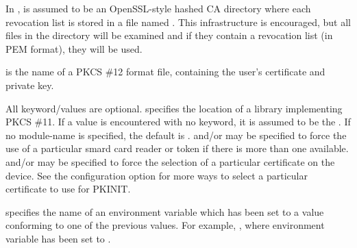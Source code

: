\documentclass[letterpaper,10pt,english]{sphinxmanual}
\begin{document}
\begin{description}
In ,  is assumed to be an OpenSSL-style
hashed CA directory where each revocation list is stored in a file
named .  This infrastructure is encouraged,
but all files in the directory will be examined and if they
contain a revocation list (in PEM format), they will be used.

\item[{\sphinxstylestrong{PKCS12:}\sphinxstyleemphasis{filename}}] \leavevmode
{} is the name of a PKCS \#12 format file, containing the
user’s certificate and private key.

\item[{\sphinxstylestrong{PKCS11:}{[}\sphinxstylestrong{module\_name=}{]}\sphinxstyleemphasis{modname}{[}\sphinxstylestrong{:slotid=}\sphinxstyleemphasis{slot-id}{]}{[}\sphinxstylestrong{:token=}\sphinxstyleemphasis{token-label}{]}{[}\sphinxstylestrong{:certid=}\sphinxstyleemphasis{cert-id}{]}{[}\sphinxstylestrong{:certlabel=}\sphinxstyleemphasis{cert-label}{]}}] \leavevmode
All keyword/values are optional.   specifies the location
of a library implementing PKCS \#11.  If a value is encountered
with no keyword, it is assumed to be the .  If no
module-name is specified, the default is .
 and/or  may be specified to force the use of
a particular smard card reader or token if there is more than one
available.   and/or  may be specified to
force the selection of a particular certificate on the device.
See the  configuration option for more ways
to select a particular certificate to use for PKINIT.

\item[{\sphinxstylestrong{ENV:}\sphinxstyleemphasis{envvar}}] \leavevmode
{} specifies the name of an environment variable which has
been set to a value conforming to one of the previous values.  For
example, , where environment variable
 has been set to .

\end{description}
\end{document}
